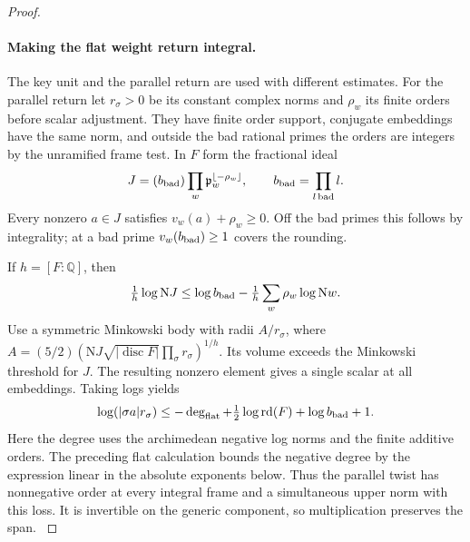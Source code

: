 \begin{proof}
\paragraph{Making the flat weight return integral.}
The key unit and the parallel return are used with
different estimates. For the parallel return let
\(r_\sigma>0\) be its constant complex norms and
\(\rho_w\) its finite orders before scalar adjustment.
They have finite order support, conjugate embeddings
have the same norm, and outside the bad rational primes
the orders are integers by the unramified frame test.
In \(F\) form the fractional ideal
\[
      J=(b_{\rm bad})\prod_w\mathfrak p_w^{\lfloor-\rho_w\rfloor},
             \qquad b_{\rm bad}=\prod_{l\,\mathrm{bad}} l .
\]
Every nonzero \(a\in J\) satisfies
\(v_w(a)+\rho_w\ge0\). Off the bad primes this follows
by integrality; at a bad prime \(v_w(b_{\rm bad})\ge1\)
covers the rounding.

If \(h=[F:\mathbb Q]\), then
\[
 \tfrac1h\log\mathrm N J\le\log b_{\rm bad}
            -\tfrac1h\sum_w\rho_w\log\mathrm N w.
\]
Use a symmetric Minkowski body with radii
\(A/r_\sigma\), where
\(A=(5/2)(\mathrm N J\sqrt{|\operatorname{disc}F|}
\prod_\sigma r_\sigma)^{1/h}\). Its volume exceeds
the Minkowski threshold for \(J\). The resulting nonzero
element gives a single scalar at all embeddings. Taking
logs yields
\begin{equation}\label{eq:parallel-return-norm}
  \log(|\sigma a|r_\sigma)\le
  -\deg_{\rm flat}+\tfrac12\log\operatorname{rd}(F)
             +\log b_{\rm bad}+1 .
\end{equation}
Here the degree uses the archimedean negative log norms
and the finite additive orders. The preceding flat
calculation bounds the negative degree by the expression
linear in the absolute exponents below. Thus the
parallel twist has nonnegative order at every integral
frame and a simultaneous upper norm with this loss. It
is invertible on the generic component, so multiplication
preserves the span. \label{cor:deep-short-readings-4}
\end{proof}
